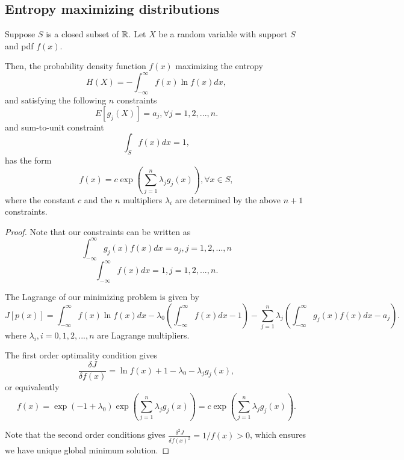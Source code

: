 \begin{refsection}
\subsection{Entropy maximizing distributions}



\begin{theorem}\label{ch:statistical-learning:th:continuousDistributionWithMaximumEntropy}
	Suppose $S$ is a closed subset of $\mathbb{R}$. Let $X$ be a random variable with support $S$ and pdf $f(x)$.
	
	Then, the probability density function $f(x)$ maximizing the entropy
	$$H(X) = -\int_{-\infty}^{\infty} f(x)\ln f(x) dx,$$
	and satisfying the following $n$ constraints
	$$E[g_j(X)] = a_j, \forall j=1,2,...,n.$$
	and sum-to-unit constraint
	$$\int_S f(x) dx = 1,$$
	has the form
	$$f(x) = c\exp(\sum_{j=1}^{n} \lambda_j g_j(x)), \forall x\in S,$$
	where the constant $c$ and the $n$ multipliers $\lambda_i$ are determined by the above $n+1$ constraints.
\end{theorem}
\begin{proof}
	Note that our constraints can be written as
	$$\int_{-\infty}^{\infty} g_j(x)f(x) dx = a_j,j = 1,2,...,n $$	
	$$\int_{-\infty}^{\infty} f(x) dx = 1,j = 1,2,...,n.$$	
	
	The Lagrange of our minimizing problem is given by
	$$J[p(x)] = \int_{-\infty}^{\infty} f(x)\ln f(x) dx - \lambda_0(\int_{-\infty}^{\infty} f(x) dx - 1) - \sum_{j=1}^{n} \lambda_j(\int_{-\infty}^{\infty} g_j(x)f(x) dx - a_j).$$
	where $\lambda_i,i=0,1,2,...,n$ are Lagrange multipliers.
	
	The first order optimality condition gives
	$$\frac{\delta J}{\delta f(x)} = \ln f(x) + 1 - \lambda_0 - \lambda_j g_j(x),$$
	or equivalently 
	$$f(x) = \exp(-1+\lambda_0) \exp(\sum_{j=1}^{n} \lambda_j g_j(x)) = c\exp(\sum_{j=1}^{n} \lambda_j g_j(x)).$$
	
	Note that the second order conditions gives $\frac{\delta^2 J}{\delta f(x)^2} = 1/f(x) > 0$, which ensures we have unique global minimum solution. 
\end{proof}



\end{refsection}
